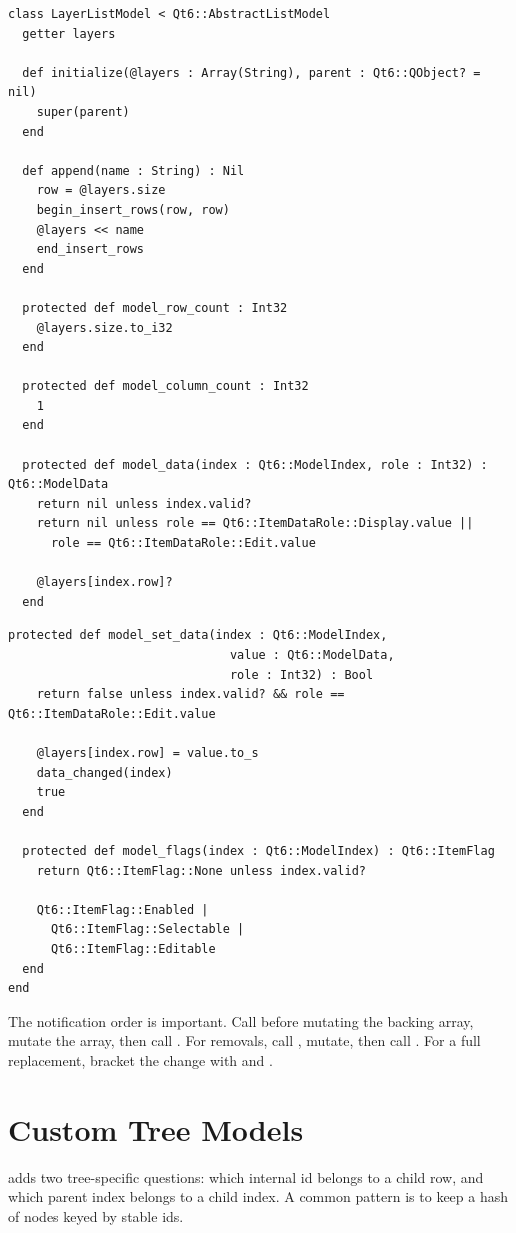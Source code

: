 \begin{lstlisting}[style=crystal]
class LayerListModel < Qt6::AbstractListModel
  getter layers

  def initialize(@layers : Array(String), parent : Qt6::QObject? = nil)
    super(parent)
  end

  def append(name : String) : Nil
    row = @layers.size
    begin_insert_rows(row, row)
    @layers << name
    end_insert_rows
  end

  protected def model_row_count : Int32
    @layers.size.to_i32
  end

  protected def model_column_count : Int32
    1
  end

  protected def model_data(index : Qt6::ModelIndex, role : Int32) : Qt6::ModelData
    return nil unless index.valid?
    return nil unless role == Qt6::ItemDataRole::Display.value ||
      role == Qt6::ItemDataRole::Edit.value

    @layers[index.row]?
  end
\end{lstlisting}

\begin{lstlisting}[style=crystal]
  protected def model_set_data(index : Qt6::ModelIndex,
                               value : Qt6::ModelData,
                               role : Int32) : Bool
    return false unless index.valid? && role == Qt6::ItemDataRole::Edit.value

    @layers[index.row] = value.to_s
    data_changed(index)
    true
  end

  protected def model_flags(index : Qt6::ModelIndex) : Qt6::ItemFlag
    return Qt6::ItemFlag::None unless index.valid?

    Qt6::ItemFlag::Enabled |
      Qt6::ItemFlag::Selectable |
      Qt6::ItemFlag::Editable
  end
end
\end{lstlisting}

The notification order is important. Call  before mutating the backing array, mutate the array, then call . For removals, call , mutate, then call . For a full replacement, bracket the change with  and .

\section{Custom Tree Models}

 adds two tree-specific questions: which internal id belongs to a child row, and which parent index belongs to a child index. A common pattern is to keep a hash of nodes keyed by stable ids.

